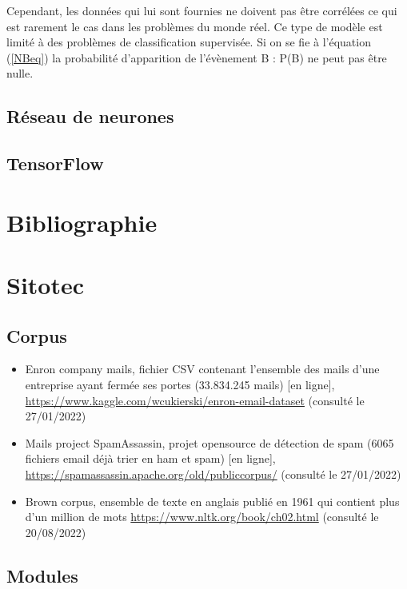 \documentclass[a4paper,12pt]{article}
\begin{document}
				Cependant, les données qui lui sont fournies ne doivent pas être corrélées ce qui est rarement le cas dans les problèmes du monde réel. Ce type de modèle est limité à des problèmes de classification supervisée. Si on se fie à l'équation (\ref{NBeq}) la probabilité d'apparition de l’évènement B : P(B) ne peut pas être nulle. 
						
		\subsection{Réseau de neurones}		
		
		\subsection{TensorFlow}
		
		
		
										
	\section{Bibliographie}
		
		


		
	\section{Sitotec}
		\subsection{Corpus}
			\begin{itemize}
				\item Enron company mails, fichier CSV contenant l'ensemble des mails d'une entreprise ayant fermée ses portes (33.834.245 mails) [en ligne], \url{https://www.kaggle.com/wcukierski/enron-email-dataset} (consulté le 27/01/2022) \label{Enron_dataset}
				\item Mails project SpamAssassin, projet opensource de détection de spam (6065 fichiers email déjà trier en ham et spam) [en ligne], \url{https://spamassassin.apache.org/old/publiccorpus/} (consulté le 27/01/2022) \label{SpamAssassin_dataset}
				\item Brown corpus, ensemble de texte en anglais publié en 1961 qui contient plus d'un million de mots \url{https://www.nltk.org/book/ch02.html} (consulté le 20/08/2022) \label{Brown_corpus}
			\end{itemize}
		
		\subsection{Modules}
\end{document}
